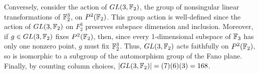 \documentclass{article}
\begin{document}
Conversely, consider the action of $GL(3, \mathbb{F}_2)$, the group of nonsingular linear transformations of $\mathbb{F}_2^3$, on $P^2(\mathbb{F}_2)$. This group action is well-defined since the action of $GL(3, \mathbb{F}_2)$  on $F_2^3$ preserves subspace dimension and inclusion.  Moreover, if $g \in GL(3, \mathbb{F}_2)$ fixes $P^2(\mathbb{F}_2)$, then, since every 1-dimensional subspace of $\mathbb{F}_3$ has only one nonzero point, $g$ must fix $\mathbb{F}_2^3$. Thus, $GL(3, \mathbb{F}_2)$ acts faithfully on $P^2(\mathbb{F}_2)$, so is isomorphic to a subgroup of the automorphism group of the Fano plane.   Finally, by counting column choices, $|GL(3, \mathbb{F}_2)| = (7)(6)(3) = 168$.



\end{document}
